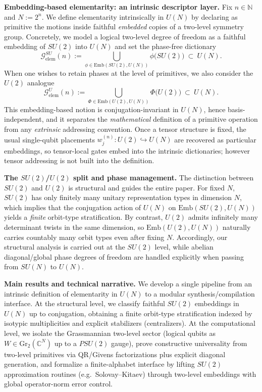 \documentclass{article}%
\theoremstyle{definition}
\numberwithin{equation}{section}
\newcommand{\N}{\mathbb{N}}
\newcommand{\C}{\mathbb{C}}
\newcommand{\Gr}{\mathrm{Gr}}
\newcommand{\Emb}{\mathrm{Emb}}
\begin{document}
\smallskip
\noindent\textbf{Embedding-based elementarity: an intrinsic descriptor layer.}
Fix $n\in\N$ and $N:=2^n$. We define elementarity intrinsically in $U(N)$ by declaring as primitive
the motions inside faithful \emph{embedded} copies of a two-level symmetry group. Concretely, we
model a logical two-level degree of freedom as a faithful embedding of $SU(2)$ into $U(N)$ and set
the phase-free dictionary
\[
\mathcal{G}^{SU}_{\mathrm{elem}}(n)
:=
\bigcup_{\phi\in \Emb(SU(2),U(N))}\phi\big(SU(2)\big)
\ \subset\ U(N).
\]
When one wishes to retain phases at the level of primitives, we also consider the $U(2)$ analogue
\[
\mathcal{G}^{U}_{\mathrm{elem}}(n)
:=
\bigcup_{\Phi\in \Emb(U(2),U(N))}\Phi\big(U(2)\big)
\ \subset\ U(N).
\]
This embedding-based notion is conjugation-invariant in $U(N)$, hence basis-independent, and it
separates the \emph{mathematical} definition of a primitive operation from any \emph{extrinsic}
addressing convention. Once a tensor structure is fixed, the usual single-qubit placements
$w^{(n)}_j:U(2)\hookrightarrow U(N)$ are recovered as particular embeddings, so tensor-local gates
embed into the intrinsic dictionaries; however tensor addressing is not built into the definition.

\smallskip
\noindent\textbf{The $SU(2)$/$U(2)$ split and phase management.}
The distinction between $SU(2)$ and $U(2)$ is structural and guides the entire paper. For fixed $N$,
$SU(2)$ has only finitely many unitary representation types in dimension $N$, which implies that the
conjugation action of $U(N)$ on $\Emb(SU(2),U(N))$ yields a \emph{finite} orbit-type stratification.
By contrast, $U(2)$ admits infinitely many determinant twists in the same dimension, so
$\Emb(U(2),U(N))$ naturally carries countably many orbit types even after fixing $N$. Accordingly,
our structural analysis is carried out at the $SU(2)$ level, while abelian diagonal/global phase
degrees of freedom are handled explicitly when passing from $SU(N)$ to $U(N)$.

\smallskip
\noindent\textbf{Main results and technical narrative.}
We develop a single pipeline from an intrinsic definition of elementarity in $U(N)$ to a modular synthesis/compilation interface.
At the structural level, we classify faithful $SU(2)$ embeddings in $U(N)$ up to conjugation, obtaining a finite orbit-type stratification
indexed by isotypic multiplicities and explicit stabilizers (centralizers).
At the computational level, we isolate the Grassmannian two-level sector (logical qubits as $W\in\Gr_2(\C^N)$ up to a $PSU(2)$ gauge),
prove constructive universality from two-level primitives via QR/Givens factorizations plus explicit diagonal generation, and formalize a
finite-alphabet interface by lifting $SU(2)$ approximation routines (e.g.\ Solovay--Kitaev) through two-level embeddings with global
operator-norm error control.
\end{document}
